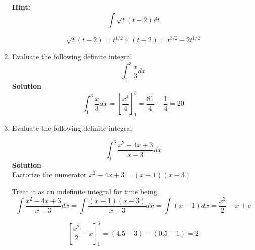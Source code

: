 \documentclass[a4paper,12pt]{article}
\begin{document}
\begin{enumerate}
\begin{multicols}{2}
\begin{enumerate}[(i)]
		
		
		
	\end{enumerate}
\end{multicols}

\begin{framed}
	\textbf{Hint:} 
	\[ \int \sqrt{t}(t-2) dt \]
	
	\[ \sqrt{t}(t-2) = t^{1/2} \times (t - 2) = t^{3/2} - 2t^{1/2}\]
	
\end{framed}







\item Evaluate the following definite integral
		\[ \int^{3}_{1} \frac{x}{3}  dx \]
		\textbf{Solution}
		\[ \int^{3}_{1} \frac{x}{3}  dx  = \left[\frac{x^4}{4}\right]^{3}_{1}= \frac{81}{4} - \frac{1}{4} = 20\]
	
\item Evaluate the following definite integral
		
		\[ \int^3_1 \frac{x^2 - 4x + 3}{x-3}  dx \] 
	\smallskip	
	\textbf{Solution}\\
	\noindent	Factorize the numerator $x^2 - 4x + 3 = (x-1)(x-3)$
		
		
		Treat it as an indefinite integral for time being.			
		\[ \int \frac{x^2 - 4x + 3}{x-3}  dx = \int \frac{(x-1)(x-3)}{x-3}  dx  = \int (x-1) dx = \frac{x^2}{2} -x +c\] 
		
		\[ \left[ \frac{x^2}{2} -x\right]^{3}_{1} = (4.5-3)-(0.5-1) = 2\]
\end{enumerate}
\end{document}
